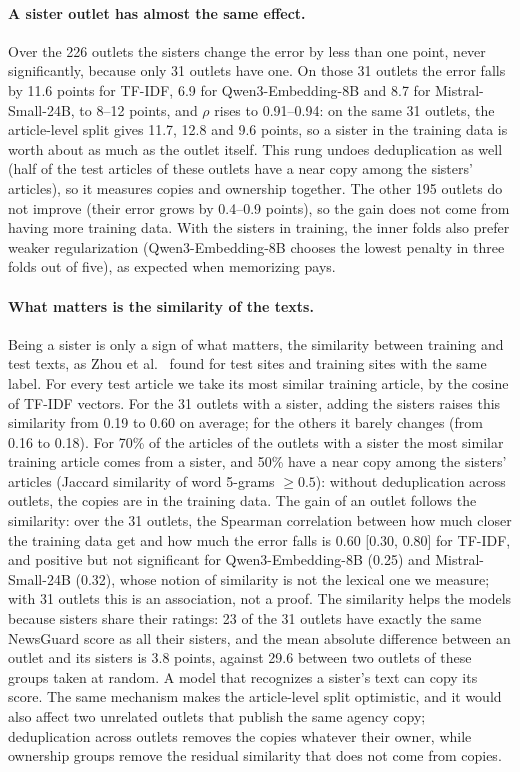 \documentclass[11pt,a4paper]{article}
\begin{document}
\paragraph{A sister outlet has almost the same effect.}
Over the 226 outlets the sisters change the error by less than one point, never significantly, because only 31 outlets
have one. On those 31 outlets the error falls by 11.6 points for TF-IDF, 6.9 for Qwen3-Embedding-8B and 8.7 for
Mistral-Small-24B, to 8--12 points, and $\rho$ rises to 0.91--0.94: on the same 31 outlets, the article-level split
gives 11.7, 12.8 and 9.6 points, so a sister in the training data is worth about as much as the outlet itself. This
rung undoes deduplication as well (half of the test articles of these outlets have a near copy among the sisters'
articles), so it measures copies and ownership together. The other 195
outlets do not improve (their error grows by 0.4--0.9 points), so the gain does not come from having more training
data. With the sisters in training, the inner folds also prefer weaker regularization (Qwen3-Embedding-8B chooses the
lowest penalty in three folds out of five), as expected when memorizing pays.

\paragraph{What matters is the similarity of the texts.}
Being a sister is only a sign of what matters, the similarity between training and test texts, as Zhou et
al.~\cite{zhou2021hidden} found for test sites and training sites with the same label. For every test
article we take its most similar training article, by the cosine of TF-IDF vectors. For the 31 outlets with a sister,
adding the sisters raises this similarity from 0.19 to 0.60 on average; for the others it barely changes (from 0.16 to
0.18). For 70\% of the articles of the outlets with a sister the most similar training article comes from a sister, and
50\% have a near copy among the sisters' articles (Jaccard similarity of word 5-grams $\geq 0.5$): without
deduplication across outlets, the copies are in the training data. The gain of an outlet follows the similarity: over
the 31 outlets, the Spearman correlation between how much closer the training data get and how much the error falls is
0.60 [0.30, 0.80] for TF-IDF, and positive but not significant for Qwen3-Embedding-8B (0.25) and Mistral-Small-24B
(0.32), whose notion of similarity is not the lexical one we measure; with 31 outlets this is an association, not a
proof. The similarity helps the models because sisters share their ratings: 23 of the 31 outlets have exactly the same NewsGuard score as all their sisters, and the mean absolute
difference between an outlet and its sisters is 3.8 points, against 29.6 between two outlets of these groups taken at
random. A model that recognizes a sister's text can copy its score. The same mechanism makes the article-level split
optimistic, and it would also affect two unrelated outlets that publish the same agency copy; deduplication across
outlets removes the copies whatever their owner, while ownership groups remove the residual similarity that does not
come from copies.
\end{document}

